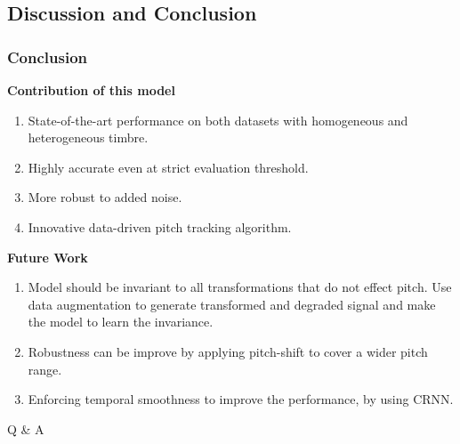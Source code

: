 \documentclass{beamer}
\begin{document}
\subsection{Discussion and Conclusion}
\begin{frame}
\frametitle{Conclusion}
\textbf{Contribution of this model}\\
\begin{enumerate}
    \item State-of-the-art performance on both datasets with homogeneous and heterogeneous timbre.
    \item Highly accurate even at strict evaluation threshold.
    \item More robust to added noise.
    \item Innovative data-driven pitch tracking algorithm.
\end{enumerate}

\textbf{Future Work}\\
\begin{enumerate}
    \item Model should be invariant to all transformations that do not effect pitch. Use data augmentation to generate transformed and degraded signal and make the model to learn the invariance.  %
    \item Robustness can be improve by applying pitch-shift to cover a wider pitch range.
    \item Enforcing temporal smoothness to improve the performance, by using CRNN.
\end{enumerate}
\end{frame}

\begin{frame}
\Huge{\centerline{Q \& A}}
\end{frame}

\end{document}
